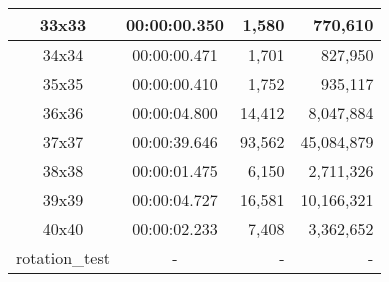 \begin{center}
\begin{tabular}{|c|c|r|r|}
		33x33 & 00:00:00.350 & 1,580 & 770,610 \\ \hline
		34x34 & 00:00:00.471 & 1,701 & 827,950 \\ \hline
		35x35 & 00:00:00.410 & 1,752 & 935,117 \\ \hline
		36x36 & 00:00:04.800 & 14,412 & 8,047,884 \\ \hline
		37x37 & 00:00:39.646 & 93,562 & 45,084,879 \\ \hline
		38x38 & 00:00:01.475 & 6,150 & 2,711,326 \\ \hline
		39x39 & 00:00:04.727 & 16,581 & 10,166,321 \\ \hline
		40x40 & 00:00:02.233 & 7,408 & 3,362,652 \\ \hline
		rotation\_test & - & - & - \\ \hline

    \end{tabular}
\end{center}

